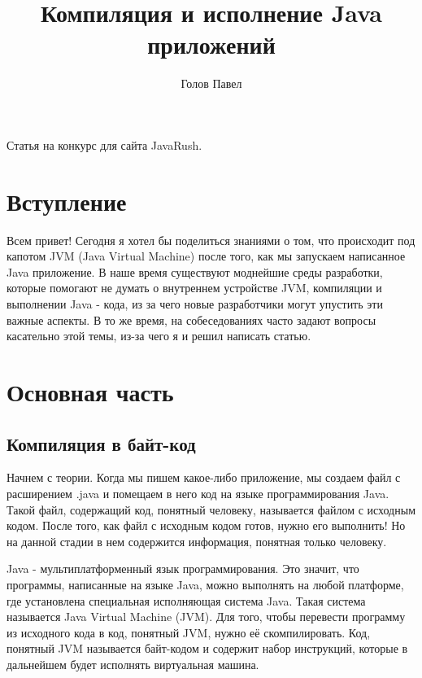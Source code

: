 \documentclass[]{scrartcl}
\title{Компиляция и исполнение Java приложений}
\author{Голов Павел}
\begin{document}
\maketitle

\begin{center}
	Статья на конкурс для сайта JavaRush.
\end{center}

\thispagestyle{empty}

\newpage

\section{Вступление}

Всем привет! Сегодня я хотел бы поделиться знаниями о том, что происходит под капотом JVM (Java Virtual Machine) после того, как мы запускаем написанное Java приложение. В наше время существуют моднейшие среды разработки, которые помогают не думать о внутреннем устройстве JVM, компиляции и выполнении Java - кода, из за чего новые разработчики могут упустить эти важные аспекты. В то же время, на собеседованиях часто задают вопросы касательно этой темы,  из-за чего я и решил написать статью.

\section{Основная часть}

\subsection{Компиляция в байт-код}

Начнем с теории. Когда мы пишем какое-либо приложение, мы создаем файл с расширением .java и помещаем в него код на языке программирования Java. Такой файл, содержащий код, понятный человеку, называется файлом с исходным кодом. После того, как файл с исходным кодом готов, нужно его выполнить! Но на данной стадии в нем содержится информация, понятная только человеку. 

Java - мультиплатформенный язык программирования. Это значит, что программы, написанные на языке Java, можно выполнять на любой платформе, где установлена специальная исполняющая система Java. Такая система называется Java Virtual Machine (JVM). Для того, чтобы перевести программу из исходного кода в код, понятный JVM, нужно её скомпилировать. Код, понятный JVM называется байт-кодом и содержит набор инструкций, которые в дальнейшем будет исполнять виртуальная машина.
\end{document}
